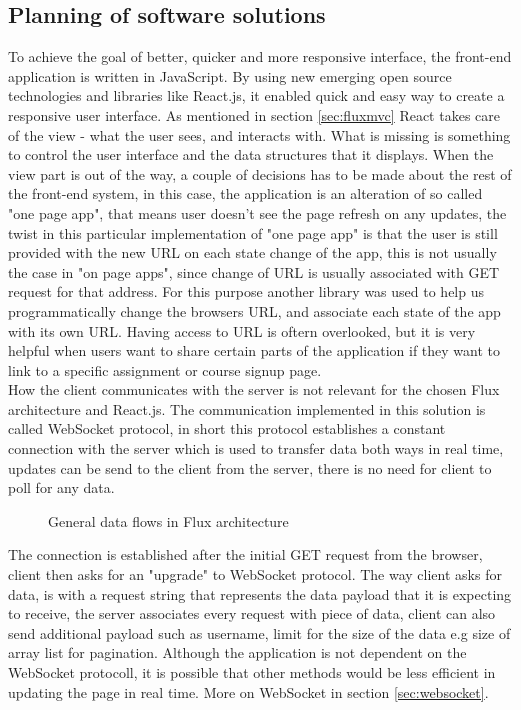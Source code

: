 \subsection{Planning of software solutions}\label{sec:softwaresolution}
To achieve the goal of better, quicker and more responsive interface, the front-end application is written in JavaScript. By using new emerging open source technologies and libraries like React.js, it enabled quick and easy way to create a responsive user interface. As mentioned in section \ref{sec:fluxmvc} React takes care of the view - what the user sees, and interacts with. What is missing is something to control the user interface and the data structures that it displays. When the view part is out of the way, a couple of decisions has to be made about the rest of the front-end system, in this case, the application is an alteration of so called "one page app", that means user doesn't see the page refresh on any updates, the twist in this particular implementation of "one page app" is that the user is still provided with the new URL on each state change of the app, this is not usually the case in "on page apps", since change of URL is usually associated with GET request for that address. For this purpose another library was used to help us programmatically change the browsers URL, and associate each state of the app with its own URL. Having access to URL is oftern overlooked, but it is very helpful when users want to share certain parts of the application if they want to link to a specific assignment or course signup page.
\\How the client communicates with the server is not relevant for the chosen Flux architecture and React.js. The communication implemented in this solution is called WebSocket protocol, in short this protocol establishes a constant connection with the server which is used to transfer data both ways in real time, updates can be send to the client from the server, there is no need for client to poll for any data.
\begin{figure}[h]
\centering

\caption{General data flows in Flux architecture}
\end{figure}
 The connection is established after the initial GET request from the browser, client then asks for an "upgrade" to WebSocket protocol. The way client asks for data, is with a request string that represents the data payload that it is expecting to receive, the server associates every request with piece of data, client can also send additional payload such as username, limit for the size of the data e.g size of array list for pagination. Although the application is not dependent on the WebSocket protocoll, it is possible that other methods would be less efficient in updating the page in real time. More on WebSocket in section \ref{sec:websocket}.
